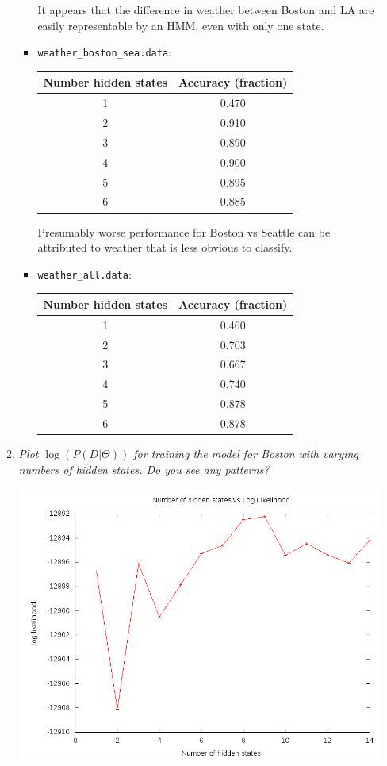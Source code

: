\documentclass{article}
\begin{document}
\begin{enumerate}[(a)]
\begin{enumerate}
\begin{itemize}
    It appears that the difference in weather between Boston and LA are 
    easily representable by an HMM, even with only one state. 

    \item \texttt{weather\_boston\_sea.data}:\\

    \begin{tabular}{|cc|}
    \hline
    Number hidden states & Accuracy (fraction)\\
    \hline
    1 & 0.470\\
    2 & 0.910\\
    3 & 0.890\\
    4 & 0.900\\
    5 & 0.895\\
    6 & 0.885\\
    \hline
    \end{tabular}

    Presumably worse performance for Boston vs Seattle can be attributed
    to weather that is less obvious to classify. 

    \item \texttt{weather\_all.data}:\\

    \begin{tabular}{|cc|}
    \hline
    Number hidden states & Accuracy (fraction)\\
    \hline
    1 & 0.460\\
    2 & 0.703\\
    3 & 0.667\\
    4 & 0.740\\
    5 & 0.878\\
    6 & 0.878\\
    \hline
    \end{tabular}

    \end{itemize}

  \item \emph{Plot $\log(P(D|\Theta))$ for training the model for Boston with
    varying numbers of hidden states. Do you see any patterns?}

    \includegraphics[scale=0.5]{4civ_plot.png}


\end{enumerate}
\end{enumerate}
\end{document}
